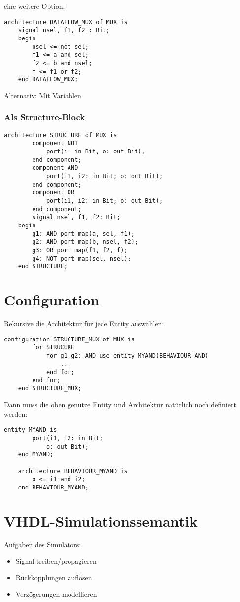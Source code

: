 eine weitere Option:
\begin{lstlisting}[style=vhdl]
    architecture DATAFLOW_MUX of MUX is
    signal nsel, f1, f2 : Bit;
    begin
        nsel <= not sel;
        f1 <= a and sel;
        f2 <= b and nsel;
        f <= f1 or f2;
    end DATAFLOW_MUX;
\end{lstlisting}
Alternativ: Mit Variablen

\subsubsection{Als Structure-Block}
\begin{lstlisting}[style=vhdl]
    architecture STRUCTURE of MUX is
        component NOT
            port(i: in Bit; o: out Bit);
        end component;
        component AND
            port(i1, i2: in Bit; o: out Bit);
        end component;
        component OR
            port(i1, i2: in Bit; o: out Bit);
        end component;
        signal nsel, f1, f2: Bit;
    begin
        g1: AND port map(a, sel, f1);
        g2: AND port map(b, nsel, f2);
        g3: OR port map(f1, f2, f);
        g4: NOT port map(sel, nsel);
    end STRUCTURE;
\end{lstlisting}

\section{Configuration}
Rekursive die Architektur für jede Entity auswählen:
\begin{lstlisting}[style=vhdl]
    configuration STRUCTURE_MUX of MUX is
        for STRUCURE
            for g1,g2: AND use entity MYAND(BEHAVIOUR_AND)
                ...
            end for;
        end for;
    end STRUCTURE_MUX;
\end{lstlisting}

Dann muss die oben genutze Entity und Architektur natürlich noch definiert werden:
\begin{lstlisting}[style=vhdl]
    entity MYAND is
        port(i1, i2: in Bit; 
            o: out Bit);
    end MYAND;

    architecture BEHAVIOUR_MYAND is
        o <= i1 and i2;
    end BEHAVIOUR_MYAND;
\end{lstlisting}

\section{VHDL-Simulationssemantik}
Aufgaben des Simulators:
\begin{itemize}
    \item Signal treiben/propagieren
    \item Rückkopplungen auflösen
    \item Verzögerungen modellieren
\end{itemize}

